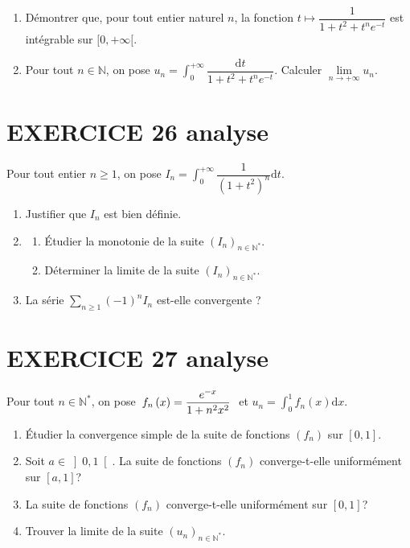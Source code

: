\documentclass[10pt,oneside]{article}
\begin{document}
\begin{flushleft}
\begin{enumerate}
\item Démontrer que, pour tout entier naturel $n$, la fonction $t\longmapsto \dfrac{1}{1+t^{2}+t^{n}e^{-t}}$ est int\'{e}grable sur $[0,+\infty[$.
\item Pour tout $n\in\mathbb{N}$, on pose $u_{n}=\displaystyle\int_{0}^{+\infty }\dfrac{\text{d}t}{1+t^{2}+t^{n}e^{-t}}$. Calculer $\underset{n\rightarrow +\infty }{\lim }u_{n}$.
\end{enumerate}

		

\section*{EXERCICE 26 \:analyse }

Pour tout entier $n\geqslant 1$, on pose $I_{n}=\displaystyle\int_{0}^{+\infty } \dfrac{1}{\left( 1+t^{2}\right) ^n} \text{d}t$.

\begin{enumerate}
\item Justifier que $I_{n}$ est bien d\'{e}finie.
\item 
\begin{enumerate}
\item
\'Etudier la monotonie de la suite $\left( I_{n}\right) _{n\in\mathbb{N}^*}$.
\item
 D\'{e}terminer la limite de la suite $\left( I_{n}\right) _{n\in\mathbb{N}^*}$.
\end{enumerate}
\item La s\'{e}rie $\displaystyle\sum\limits_{n\geqslant 1}^{}(-1)^n I_{n}$ est-elle convergente ?

\end{enumerate}


\section*{EXERCICE 27 \:analyse }

Pour tout $n\in \mathbb{N}^*$, on pose\ $f_{n}\left( x\right) =\dfrac{e^{-x}}{%
1+n^{2}x^{2}}\ \ $et $u_{n}=\displaystyle\int_{0}^{1}f_{n}\left( x\right) \mathrm{d}x$.

\begin{enumerate}
\item \'Etudier la convergence simple de la suite de fonctions $\left( f_{n}\right) $  sur $[0,1]$.
\item
Soit $a\in\left] 0,1 \right[$.  La suite de  fonctions $\left( f_{n}\right) $ converge-t-elle uniformément sur $\left[a,1 \right]$? 
\item
 La suite de  fonctions $\left( f_{n}\right) $ converge-t-elle uniformément   sur $[0,1]$?
\item Trouver la limite de la suite $\left( u_{n}\right) _{n\in \mathbb{N}^*}.$
\end{enumerate}



\end{flushleft}
\end{document}
